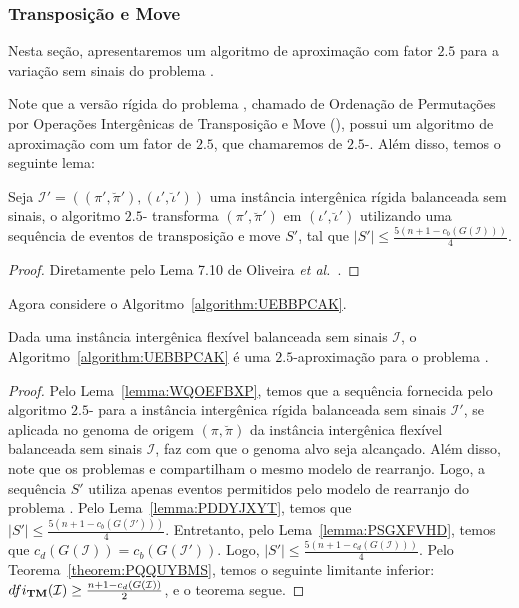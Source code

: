 \subsubsection{Transposição e Move}

Nesta seção, apresentaremos um algoritmo de aproximação com fator $2.5$ para a variação sem sinais do problema \SbFITM{}. 

Note que a versão rígida do problema \SbFITM{}, chamado de Ordenação de Permutações por Operações Intergênicas de Transposição e Move (\SbITM), possui um algoritmo de aproximação com um fator de $2.5$, que chamaremos de $2.5$-\SbITM{}. Além disso, temos o seguinte lema:

\begin{lemma}\label{lemma:PDDYJXYT}
Seja $\mathcal{I}' = ((\pi',\breve\pi'),(\iota',\breve\iota'))$ uma instância intergênica rígida balanceada sem sinais, o algoritmo $2.5$-\SbITM{} transforma $(\pi',\breve\pi')$ em $(\iota',\breve\iota')$ utilizando uma sequência de eventos de transposição e move $S'$, tal que $|S'| \le \frac{5({n+1} - c_b(G(\mathcal{I})))}{4}$.
\end{lemma}
\begin{proof}
Diretamente pelo Lema 7.10 de Oliveira \textit{et al.}~\cite{2021a-oliveira-etal}.
\end{proof}

Agora considere o Algoritmo~\ref{algorithm:UEBBPCAK}.



\begin{theorem}\label{theorem:DWYTBIPX}
Dada uma instância intergênica flexível balanceada sem sinais $\mathcal{I}$, o Algoritmo~\ref{algorithm:UEBBPCAK} é uma $2.5$-aproximação para o problema \SbFITM{}.
\end{theorem}
\begin{proof}
Pelo Lema~\ref{lemma:WQOEFBXP}, temos que a sequência fornecida pelo algoritmo $2.5$-\SbITM{} para a instância intergênica rígida balanceada sem sinais $\mathcal{I'}$, se aplicada no genoma de origem $(\pi,\breve\pi)$ da instância intergênica flexível balanceada sem sinais $\mathcal{I}$, faz com que o genoma alvo seja alcançado. Além disso, note que os problemas \SbITM{} e \SbFITM{} compartilham o mesmo modelo de rearranjo. Logo, a sequência $S'$ utiliza apenas eventos permitidos pelo modelo de rearranjo do problema \SbFITM{}. Pelo Lema~\ref{lemma:PDDYJXYT}, temos que $|S'| \le \frac{5({n+1} - c_b(G(\mathcal{I}')))}{4}$. Entretanto, pelo Lema~\ref{lemma:PSGXFVHD}, temos que $c_d(G(\mathcal{I})) = c_b(G(\mathcal{I}'))$. Logo, $|S'| \le \frac{5({n+1} - c_d(G(\mathcal{I})))}{4}$. Pelo Teorema~\ref{theorem:PQQUYBMS}, temos o seguinte limitante inferior: $dfi_{\textbf{TM}}(\mathcal{I}) \ge \frac{{n+1} - c_d(G(\mathcal{I}))}{2}$, e o teorema segue.
\end{proof}

